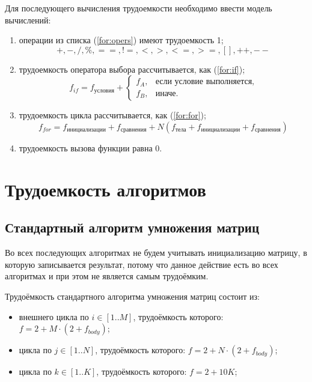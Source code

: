 Для последующего вычисления трудоемкости необходимо ввести модель вычислений:
\begin{enumerate}
    \item операции из списка (\ref{for:opers}) имеют трудоемкость 1;
        \begin{equation}
            \label{for:opers}
            +, -, /, \%, ==, !=, <, >, <=, >=, [], ++, {-}-
        \end{equation}
    \item трудоемкость оператора выбора  рассчитывается, как (\ref{for:if});
	\begin{equation}
        \label{for:if}
        f_{if} = f_{\text{условия}} +
        \begin{cases}
        f_A, & \text{если условие выполняется,}\\
        f_B, & \text{иначе.}
        \end{cases}
	\end{equation}
\item трудоемкость цикла рассчитывается, как (\ref{for:for});
    \begin{equation}
        \label{for:for}
        f_{for} = f_{\text{инициализации}} + f_{\text{сравнения}} + N(f_{\text{тела}} + f_{\text{инициализации}} + f_{\text{сравнения}})
    \end{equation}
	\item трудоемкость вызова функции равна 0.
\end{enumerate}

\section{Трудоемкость алгоритмов}

\subsection{Стандартный алгоритм умножения матриц}

Во всех последующих алгоритмах не будем учитывать инициализацию матрицу, в которую записывается результат, потому что данное действие есть во всех алгоритмах и при этом не является самым трудоёмким.

Трудоёмкость стандартного алгоритма умножения матриц состоит из:
\begin{itemize}
    \item внешнего цикла по $i \in [1..M]$, трудоёмкость которого: $f = 2 + M \cdot (2 + f_{body})$;
    \item цикла по $j \in [1..N]$, трудоёмкость которого: $f = 2 + N \cdot (2 + f_{body})$;
    \item цикла по $k \in [1..K]$, трудоёмкость которого: $f = 2 + 10K$;
\end{itemize}

